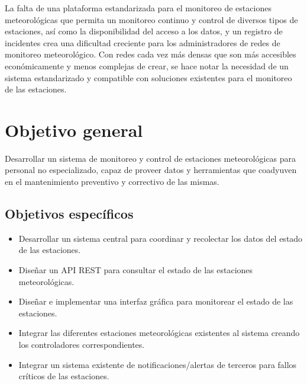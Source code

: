 La falta de una plataforma estandarizada para el monitoreo de estaciones meteorológicas que permita un monitoreo continuo y control de diversos tipos de estaciones, así como la disponibilidad del acceso a los datos, y un registro de incidentes crea una dificultad creciente para los administradores de redes de monitoreo meteorológico. Con redes cada vez más densas que son más accesibles económicamente y menos complejas de crear, se hace notar la necesidad de un sistema estandarizado y compatible con soluciones existentes para el monitoreo de las estaciones.

\section{Objetivo general}

Desarrollar un sistema de monitoreo y control de estaciones meteorológicas para personal no especializado, capaz de proveer datos y herramientas que coadyuven en el mantenimiento preventivo y correctivo de las mismas.

\subsection{Objetivos específicos}

\begin{itemize}
   \item Desarrollar un sistema central para coordinar y recolectar los datos del estado de las estaciones.

   \item Diseñar un API REST para consultar el estado de las estaciones meteorológicas.


   \item Diseñar e implementar una interfaz gráfica para monitorear el estado de las estaciones.

   \item Integrar las diferentes estaciones meteorológicas existentes al sistema creando los controladores correspondientes.

   \item Integrar un sistema existente de notificaciones/alertas de terceros para fallos críticos de las estaciones.
\end{itemize}

